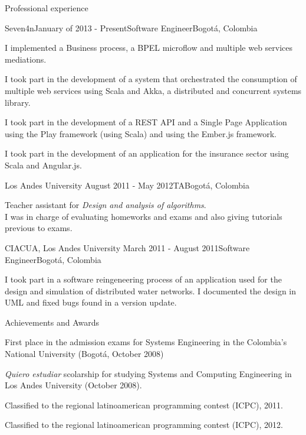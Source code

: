 \documentclass{resume} %
\def\uniandes{Los Andes University }
\begin{document}
\begin{rSection}{Professional experience}

\begin{rSubsection}{Seven4n}{January of 2013 - Present}{Software Engineer}{Bogot\'a, Colombia}
\item I implemented a Business process, a BPEL microflow and multiple web services mediations.
\item I took part in the development of a system that orchestrated the consumption of multiple web services using Scala and Akka, a distributed and concurrent systems library.
\item I took part in the development of a REST API and a Single Page Application using the Play framework (using Scala) and using the Ember.js framework.
\item I took part in the development of an application for the insurance sector using Scala and Angular.js.
\end{rSubsection}


\begin{rSubsection}{\uniandes}{August 2011 - May 2012}{TA}{Bogot\'a, Colombia}
\item Teacher assistant for \textit{Design and analysis of algorithms}.\\
I was in charge of evaluating homeworks and exams and also giving tutorials previous to exams.
\end{rSubsection}


\begin{rSubsection}{CIACUA, \uniandes}{March 2011 - August 2011}{Software Engineer}{Bogot\'a, Colombia}
\item I took part in a software reingeneering process of an application used for the design and simulation of distributed water networks. I documented the design in UML and fixed bugs found in a version update.
\end{rSubsection}

\end{rSection}

\begin{rSection}{Achievements and Awards}
\begin{rSubsection}{}{}{}{}
\item First place in the admission exams for Systems Engineering in the Colombia's National University (Bogot\'a, October 2008)
\item \textsl{Quiero estudiar} scolarship for studying Systems and Computing Engineering in Los Andes University (October 2008).
\item Classified to the regional latinoamerican programming contest (ICPC), 2011.
\item Classified to the regional latinoamerican programming contest (ICPC), 2012.
\end{rSubsection}
\end{rSection}
\end{document}
